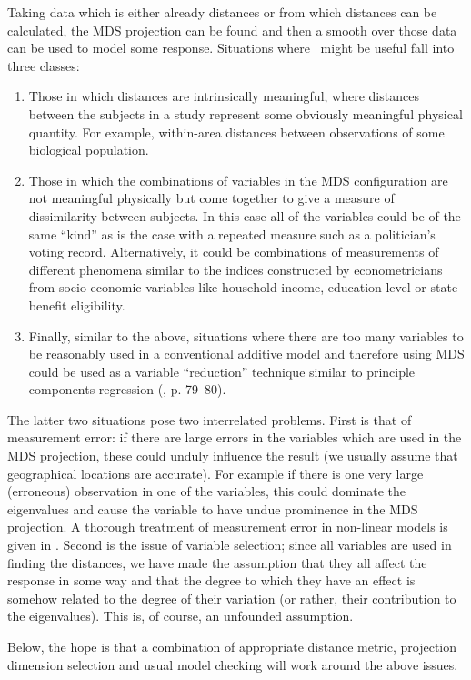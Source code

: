 Taking data which is either already distances or from which distances can be calculated, the MDS projection can be found and then a smooth over those data can be used to model some response. Situations where \mdsds\ might be useful fall into three classes: 
\begin{enumerate}
\item Those in which distances are intrinsically meaningful, where distances between the subjects in a study represent some obviously meaningful physical quantity. For example, within-area distances  between observations of some biological population.
\item Those in which the combinations of variables in the MDS configuration are not meaningful physically but come together to give a measure of dissimilarity between subjects. In this case all of the variables could be of the same ``kind'' as is the case with a repeated measure such as a politician's voting record. Alternatively, it could be combinations of measurements of different phenomena similar to the indices constructed by econometricians from socio-economic variables like household income, education level or state benefit eligibility.
\item Finally, similar to the above, situations where there are too many variables to be reasonably used in a conventional additive model and therefore using MDS could be used as a variable ``reduction'' technique similar to principle components regression (\cite{elements}, p. 79--80).
\end{enumerate}
The latter two situations pose two interrelated problems. First is that of measurement error: if there are large errors in the variables which are used in the MDS projection, these could unduly influence the result (we usually assume that geographical locations are accurate). For example if there is one very large (erroneous) observation in one of the variables, this could dominate the eigenvalues and cause the variable to have undue prominence in the MDS projection. A thorough treatment of measurement error in non-linear models is given in \cite{measurementerror}. Second is the issue of variable selection; since all variables are used in finding the distances, we have made the assumption that they all affect the response in some way and that the degree to which they have an effect is somehow related to the degree of their variation (or rather, their contribution to the eigenvalues). This is, of course, an unfounded assumption.

Below, the hope is that a combination of appropriate distance metric, projection dimension selection and usual model checking will work around the above issues.

